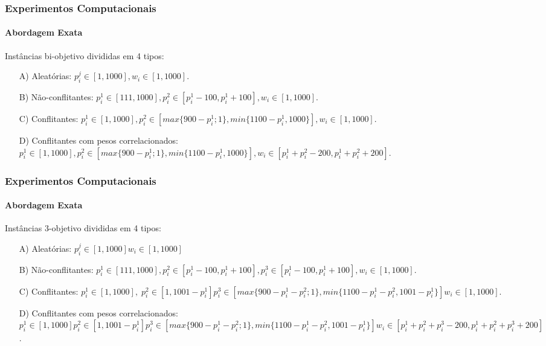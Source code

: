 \documentclass[10pt,xcolor=table,fleqn]{beamer}
\begin{document}
\begin{frame}
	\frametitle{Experimentos Computacionais}
  \framesubtitle{Abordagem Exata}
  Instâncias bi-objetivo divididas em 4 tipos:
  \vspace{3mm}
  \begin{enumerate}
    \item[A)] Aleatórias: $
      p^j_i \in [1, 1000],
      w_i \in [1,1000]$.
    \vspace{3mm}
    \item[B)] Não-conflitantes: $
      p^1_i \in [111, 1000],
      p^2_i \in [p^1_i - 100, p^1_i + 100],
      w_i \in [1,1000]$.
    \vspace{3mm}
    \item[C)] Conflitantes: $
      p^1_i \in [1, 1000],
      p^2_i \in [max\{900-p^1_i;1\}, min\{1100-p^1_i, 1000\}],
      w_i \in [1,1000]$.
    \vspace{3mm}
    \item[D)] Conflitantes com pesos correlacionados: $
      p^1_i \in [1, 1000],
      p^2_i \in [max\{900-p^1_i;1\}, min\{1100-p^1_i, 1000\}],
      w_i \in [p^1_i+p^2_i-200, p^1_i+p^2_i+200]$.
  \end{enumerate}
\end{frame}

\begin{frame}
  \frametitle{Experimentos Computacionais}
  \framesubtitle{Abordagem Exata}
  Instâncias $3$-objetivo divididas em 4 tipos:
  \begin{enumerate}
    \item[A)] Aleatórias: $
      p^j_i \in [1, 1000]
      w_i \in [1,1000]$
    \vspace{3mm}
    \item[B)] Não-conflitantes: $
      p^1_i \in [111, 1000],
      p^2_i \in [p^1_i - 100, p^1_i + 100],
      p^3_i \in [p^1_i - 100, p^1_i + 100],
      w_i \in [1,1000]$.
    \vspace{3mm}
    \item[C)] Conflitantes: $
      p^1_i \in [1, 1000], \;
      p^2_i \in [1, 1001 - p^1_i]
      p^3_i \in [max\{900-p^1_i-p^2_i;1\}, min\{1100-p^1_i-p^2_i, 1001-p^1_i\}]
      w_i \in [1,1000]$.
    \vspace{3mm}
    \item[D)] Conflitantes com pesos correlacionados: $
      p^1_i \in [1, 1000]
      p^2_i \in [1, 1001 - p^1_i]
      p^3_i \in [max\{900-p^1_i-p^2_i;1\}, min\{1100-p^1_i-p^2_i, 1001-p^1_i\}]
      w_i \in [p^1_i+p^2_i+p^3_i-200, p^1_i+p^2_i+p^3_i+200]$.
  \end{enumerate}
\end{frame}
\end{document}
